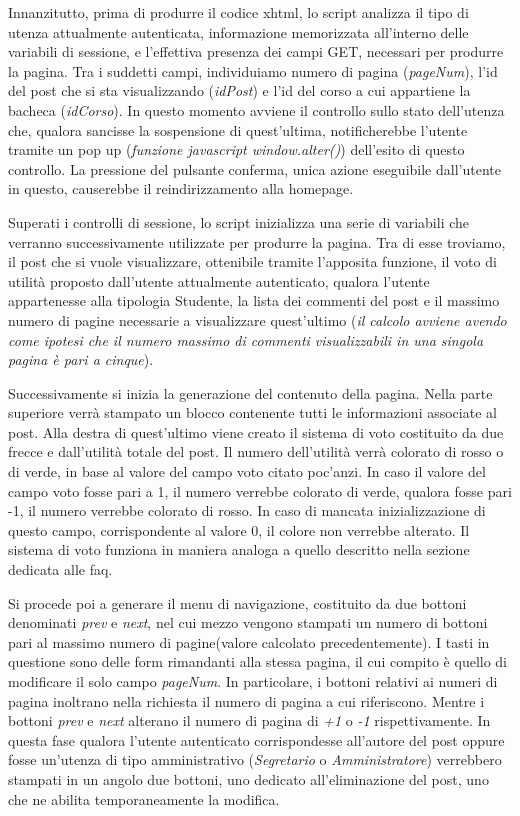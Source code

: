 \documentclass [a4paper,11pt]{book}
\begin{document}
Innanzitutto, prima di produrre il codice xhtml, lo script analizza il tipo di utenza attualmente autenticata, informazione memorizzata all'interno delle variabili di sessione, e l'effettiva presenza dei campi GET, necessari per produrre la pagina. Tra i suddetti campi, individuiamo numero di pagina (\emph{pageNum}), l'id del post che si sta visualizzando (\emph{idPost}) e l'id del corso a cui appartiene la bacheca (\emph{idCorso}). In questo momento avviene il controllo sullo stato dell'utenza che, qualora 
sancisse la sospensione di quest'ultima, notificherebbe l'utente tramite un pop up (\emph{funzione javascript window.alter()}) dell'esito di questo controllo. La pressione del pulsante conferma, unica azione eseguibile dall'utente in questo, causerebbe il reindirizzamento alla homepage.

Superati i controlli di sessione, lo script inizializza una serie di variabili che verranno successivamente utilizzate per produrre la pagina. Tra di esse troviamo, il post che si vuole visualizzare, ottenibile tramite l'apposita funzione, il voto di utilità proposto dall'utente attualmente autenticato, qualora l'utente appartenesse alla tipologia Studente, la lista dei commenti del post e il massimo numero di pagine necessarie a visualizzare quest'ultimo (\emph{il calcolo avviene avendo come ipotesi che il numero massimo di commenti visualizzabili in una singola pagina è pari a cinque}).

Successivamente si inizia la generazione del contenuto della pagina. Nella parte superiore verrà stampato un blocco contenente tutti le informazioni associate al post. Alla destra di quest'ultimo viene creato il sistema di voto costituito da due frecce e dall'utilità totale del post. Il numero dell'utilità verrà colorato di rosso o di verde, in base al valore del campo voto citato poc'anzi. In caso il valore del campo voto fosse  pari a 1, il numero verrebbe colorato di verde, qualora fosse pari -1, il numero verrebbe colorato di rosso. In caso di mancata inizializzazione di questo campo, corrispondente al valore 0, il colore non verrebbe alterato. Il sistema di voto funziona in maniera analoga a quello descritto nella sezione dedicata alle faq.

Si procede poi a generare il menu di navigazione, costituito da due bottoni denominati \emph{prev} e \emph{next}, nel cui mezzo vengono stampati un numero di bottoni pari al massimo numero di pagine(valore calcolato precedentemente). I tasti in questione sono delle form rimandanti alla stessa pagina, il cui compito è quello di modificare il solo campo \emph{pageNum}. In particolare, i bottoni relativi ai numeri di pagina inoltrano nella richiesta il numero di pagina a cui riferiscono. Mentre i bottoni \emph{prev} e \emph{next} alterano il numero di pagina di \emph{+1} o \emph{-1} rispettivamente. In questa fase qualora l'utente autenticato corrispondesse all'autore del post oppure fosse un'utenza di tipo amministrativo (\emph{Segretario} o \emph{Amministratore}) verrebbero stampati in un angolo due bottoni, uno dedicato all'eliminazione del post, uno che ne abilita temporaneamente la modifica.
\end{document}
